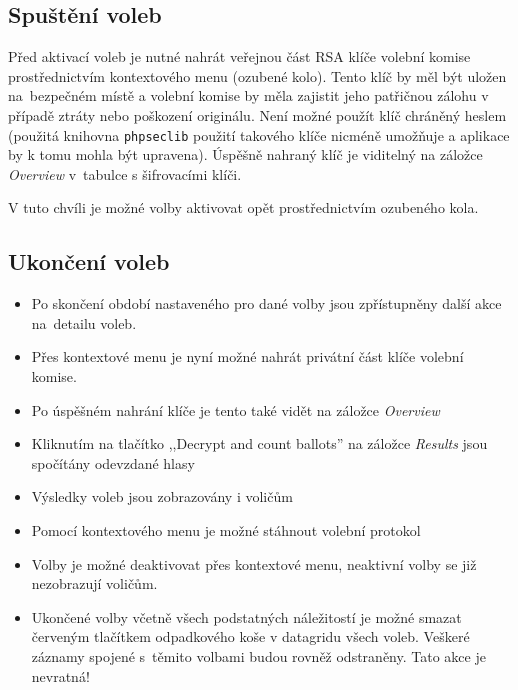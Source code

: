 \subsection*{Spuštění voleb}
Před aktivací voleb je nutné nahrát veřejnou část RSA klíče volební komise prostřednictvím kontextového menu (ozubené kolo). Tento klíč by měl být uložen na~bezpečném místě a volební komise by měla zajistit jeho patřičnou zálohu v případě ztráty nebo poškození originálu. Není možné použít klíč chráněný heslem (použitá knihovna \texttt{phpseclib} použití takového klíče nicméně umožňuje a aplikace by k tomu mohla být upravena). Úspěšně nahraný klíč je viditelný na záložce \textit{Overview} v~tabulce s šifrovacími klíči.

V tuto chvíli je možné volby aktivovat opět prostřednictvím ozubeného kola.

\subsection*{Ukončení voleb}

\begin{itemize}
	\item Po skončení období nastaveného pro dané volby jsou zpřístupněny další akce na~detailu voleb.
	\item Přes kontextové menu je nyní možné nahrát privátní část klíče volební komise.
	\item Po úspěšném nahrání klíče je tento také vidět na záložce \textit{Overview}
	\item Kliknutím na tlačítko ,,Decrypt and count ballots'' na záložce \textit{Results} jsou spočítány odevzdané hlasy
	\item Výsledky voleb jsou zobrazovány i voličům
	\item Pomocí kontextového menu je možné stáhnout volební protokol
	\item Volby je možné deaktivovat přes kontextové menu, neaktivní volby se již nezobrazují voličům.
	\item Ukončené volby včetně všech podstatných náležitostí je možné smazat červeným tlačítkem odpadkového koše v datagridu všech voleb. Veškeré záznamy spojené s~těmito volbami budou rovněž odstraněny. Tato akce je nevratná!
\end{itemize}


